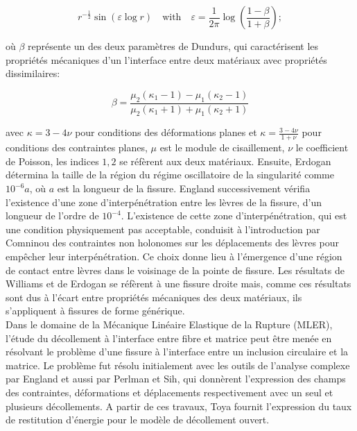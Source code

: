 \begin{equation}\label{resumefr:eq:singularitywilliams}
r^{-\frac{1}{2}}\sin\left(\varepsilon\log r\right)\quad\text{with}\quad\varepsilon=\frac{1}{2\pi}\log\left(\frac{1-\beta}{1+\beta}\right);
\end{equation}

o\`u $\beta$ repr\'esente un des deux param\`etres de Dundurs, qui caract\'erisent les propri\'et\'es m\'ecaniques d'un l'interface entre deux mat\'eriaux avec propri\'et\'es dissimilaires:

\begin{equation}\label{resumefr:eq:dundursbeta}
\beta=\frac{\mu_{2}\left(\kappa_{1}-1\right)-\mu_{1}\left(\kappa_{2}-1\right)}{\mu_{2}\left(\kappa_{1}+1\right)+\mu_{1}\left(\kappa_{2}+1\right)}
\end{equation}

avec $\kappa=3-4\nu$ pour conditions des d\'eformations planes et  $\kappa=\frac{3-4\nu}{1+\nu}$ pour conditions des contraintes planes, $\mu$ est le module de cisaillement, $\nu$ le coefficient de Poisson, les indices $1,2$ se r\'ef\`erent aux deux mat\'eriaux. Ensuite, Erdogan d\'etermina la taille de la r\'egion du r\'egime oscillatoire de la singularit\'e comme $10^{-6}a$, o\`u $a$ est la longueur de la fissure. England successivement v\'erifia l'existence d'une zone d'interp\'en\'etration entre les l\`evres de la fissure, d'un longueur de l'ordre de $10^{-4}$. L'existence de cette zone d'interp\'en\'etration, qui est une condition physiquement pas acceptable, conduisit \`a l'introduction par Comninou des contraintes non holonomes sur les d\'eplacements des l\`evres pour emp\^echer leur interp\'en\'etration. Ce choix donne lieu \`a l'\'emergence d'une r\'egion de contact entre l\`evres dans le voisinage de la pointe de fissure. Les r\'esultats de Williams et de Erdogan se r\'ef\`erent \`a une fissure droite mais, comme ces r\'esultats sont dus \`a l'\'ecart entre propri\'et\'es m\'ecaniques des deux mat\'eriaux, ils s'appliquent \`a fissures de forme g\'en\'erique.\\

Dans le domaine de la M\'ecanique Lin\'eaire Elastique de la Rupture (MLER), l'\'etude du d\'ecollement \`a l'interface entre fibre et matrice peut \^etre men\'ee en r\'esolvant le probl\`eme d'une fissure \`a l'interface entre un inclusion circulaire et la matrice. Le probl\`eme fut r\'esolu initialement avec les outils de l'analyse complexe par England et aussi par Perlman et Sih, qui donn\`erent l'expression des champs des contraintes, d\'eformations et d\'eplacements respectivement avec un seul et plusieurs d\'ecollements. A partir de ces travaux, Toya fournit l'expression du taux de restitution d'\'energie pour le mod\`ele de d\'ecollement ouvert.\\

